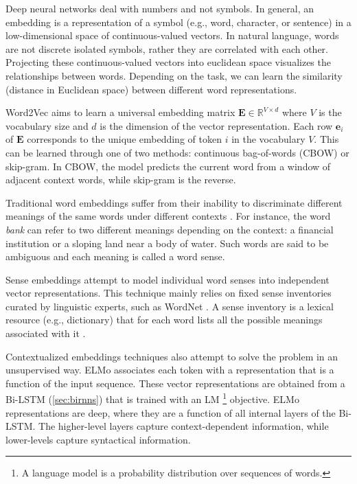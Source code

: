 Deep neural networks deal with numbers and not symbols. In general, an embedding is a representation of a symbol (e.g., word, character, or sentence) in a low-dimensional space of continuous-valued vectors. In natural language, words are not discrete isolated symbols, rather they are correlated with each other. Projecting these continuous-valued vectors into euclidean space visualizes the relationships between words. Depending on the task, we can learn the similarity (distance in Euclidean space) between different word representations.

Word2Vec \citep{mikolov2013distributed} aims to learn a universal embedding matrix $\mathbf{E} \in \mathbb{R}^{V \times d}$ where $V$ is the vocabulary size and $d$ is the dimension of the vector representation. Each row $\mathbf{e}_i$ of $\mathbf{E}$ corresponds to the unique embedding of token $i$ in the vocabulary $V$. This can be learned through one of two methods: continuous bag-of-words (CBOW) or skip-gram. In CBOW, the model predicts the current word from a window of adjacent context words, while skip-gram is the reverse.

Traditional word embeddings suffer from their inability to discriminate different meanings of the same words under different contexts \citep{camacho2018word}. For instance, the word \textit{bank} can refer to two different meanings depending on the context: a financial institution or a sloping land near a body of water. Such words are said to be ambiguous and each meaning is called a word sense.

Sense embeddings attempt to model individual word senses into independent vector representations. This technique mainly relies on fixed sense inventories curated by linguistic experts, such as WordNet \citep{miller1995wordnet}. A sense inventory is a lexical resource (e.g., dictionary) that for each word lists all the possible meanings associated with it \citep{camacho2018word}.

Contextualized embeddings techniques also attempt to solve the problem in an unsupervised way. ELMo \citep{peters2018deep} associates each token with a representation that is a function of the input sequence. These vector representations are obtained from a Bi-LSTM (\cref{sec:birnns}) that is trained with an LM \footnote{A language model is a probability distribution over sequences of words.} objective. ELMo representations are deep, where they are a function of all internal layers of the Bi-LSTM. The higher-level layers capture context-dependent information, while lower-levels capture syntactical information.


